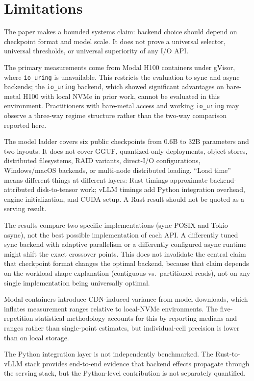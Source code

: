 \section{Limitations}
\label{sec:limitations}

The paper makes a bounded systems claim: backend choice should depend on checkpoint format and model scale. It does not prove a universal selector, universal thresholds, or universal superiority of any I/O API.

The primary measurements come from Modal H100 containers under gVisor, where \texttt{io\_uring} is unavailable. This restricts the evaluation to sync and async backends; the \texttt{io\_uring} backend, which showed significant advantages on bare-metal H100 with local NVMe in prior work, cannot be evaluated in this environment. Practitioners with bare-metal access and working \texttt{io\_uring} may observe a three-way regime structure rather than the two-way comparison reported here.

The model ladder covers six public checkpoints from 0.6B to 32B parameters and two layouts. It does not cover GGUF, quantized-only deployments, object stores, distributed filesystems, RAID variants, direct-I/O configurations, Windows/macOS backends, or multi-node distributed loading. ``Load time'' means different things at different layers: Rust timings approximate backend-attributed disk-to-tensor work; vLLM timings add Python integration overhead, engine initialization, and CUDA setup. A Rust result should not be quoted as a serving result.

The results compare two specific implementations (sync POSIX and Tokio async), not the best possible implementation of each API. A differently tuned sync backend with adaptive parallelism or a differently configured async runtime might shift the exact crossover points. This does not invalidate the central claim that checkpoint format changes the optimal backend, because that claim depends on the workload-shape explanation (contiguous vs.\ partitioned reads), not on any single implementation being universally optimal.

Modal containers introduce CDN-induced variance from model downloads, which inflates measurement ranges relative to local-NVMe environments. The five-repetition statistical methodology accounts for this by reporting medians and ranges rather than single-point estimates, but individual-cell precision is lower than on local storage.

The Python integration layer is not independently benchmarked. The Rust-to-vLLM stack provides end-to-end evidence that backend effects propagate through the serving stack, but the Python-level contribution is not separately quantified.
